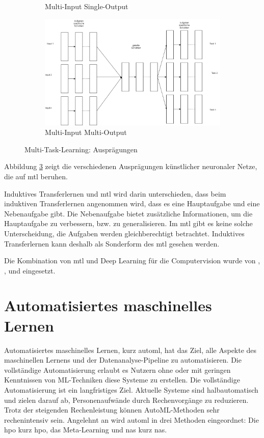 \begin{figure}[h]
\begin{subfigure}[c]{0.49\textwidth}
				\caption[MTL-MISO]{Multi-Input Single-Output}
				\label{img:MTL_MISO}	
			\end{subfigure}
			\begin{subfigure}[c]{0.49\textwidth}			
				\includegraphics[width=1\textwidth, center]{bilder/Grundlagen/MTL/MTL_MIMO.png}
				\caption[MTL-MIMO]{Multi-Input Multi-Output}
				\label{img:MTL-MIMO}	
			\end{subfigure}
			\caption{Multi-Task-Learning: Ausprägungen}
			\label{img:MultiTaskLernen}
		\end{figure}
		Abbildung \ref{img:MultiTaskLernen} zeigt die verschiedenen Ausprägungen künstlicher neuronaler Netze, die auf \ac{mtl} beruhen.
		
		Induktives Transferlernen und \acl{mtl} wird darin unterschieden, dass beim induktiven Transferlernen angenommen wird, dass es eine Hauptaufgabe und eine Nebenaufgabe gibt. Die Nebenaufgabe bietet zusätzliche Informationen, um die Hauptaufgabe zu verbessern, bzw. zu generalisieren. Im \ac{mtl} gibt es keine solche Unterscheidung, die Aufgaben werden gleichberechtigt betrachtet. Induktives Transferlernen kann deshalb als Sonderform des \acl{mtl} gesehen werden. 
		
		Die Kombination von \acl{mtl} und Deep Learning für die Computervision wurde von \cite{YuchunFang.2017}, \cite{Li.2016}, \cite{RajeevRanjan.2016} und \cite{Zhao.2019} eingesetzt.

	\section{Automatisiertes maschinelles Lernen}
	\label{sec:AutoML}
  Automatisiertes maschinelles Lernen, kurz \ac{automl}, hat das Ziel, alle Aspekte des maschinellen Lernens und der Datenanalyse-Pipeline zu automatisieren. Die vollständige Automatisierung erlaubt es Nutzern ohne oder mit geringen Kenntnissen von ML-Techniken diese Systeme zu erstellen. Die vollständige Automatisierung ist ein langfristiges Ziel. Aktuelle Systeme sind halbautomatisch und zielen darauf ab, Personenaufwände durch Rechenvorgänge zu reduzieren. Trotz der steigenden Rechenleistung können AutoML-Methoden sehr rechenintensiv sein. Angelehnt an \cite{Hutter.2019} wird \ac{automl} in drei Methoden eingeordnet: Die \acl{hpo} kurz \ac{hpo}, das  Meta-Learning und \acl{nas} kurz \ac{nas}. 
	
